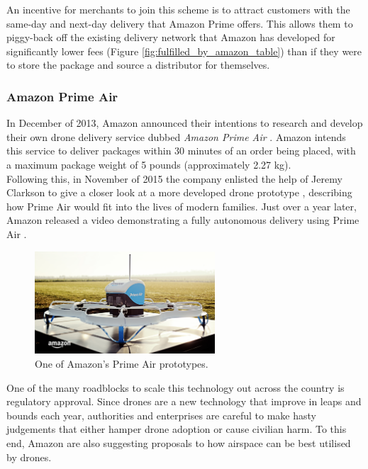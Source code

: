 \documentclass[a4paper,12pt,titlepage]{article}
\begin{document}
An incentive for merchants to join this scheme is to attract customers with the same-day and next-day delivery that Amazon Prime offers. This allows them to piggy-back off the existing delivery network that Amazon has developed for significantly lower fees (Figure \ref{fig:fulfilled_by_amazon_table}) than if they were to store the package and source a distributor for themselves.

\subsubsection{Amazon Prime Air}
In December of 2013, Amazon announced their intentions to research and develop their own drone delivery service dubbed \textit{Amazon Prime Air} \cite{Amazon.comInc.2013}. Amazon intends this service to deliver packages within 30 minutes of an order being placed, with a maximum package weight of 5 pounds (approximately 2.27 kg).\\

Following this, in November of 2015 the company enlisted the help of Jeremy Clarkson to give a closer look at a more developed drone prototype \cite{Amazon.comInc.2015b}, describing how Prime Air would fit into the lives of modern families. Just over a year later, Amazon released a video demonstrating a fully autonomous delivery using Prime Air \cite{Amazon.comInc.2016}.

\begin{figure}[!hbpt]
  \centering
  \includegraphics[width=0.6\textwidth]{img/amazon_prime_air_drone.png}
  \caption{One of Amazon's Prime Air prototypes. \cite{Amazon.comInc.}}
  \label{fig:prime_air_example}
\end{figure}

One of the many roadblocks to scale this technology out across the country is regulatory approval. Since drones are a new technology that improve in leaps and bounds each year, authorities and enterprises are careful to make hasty judgements that either hamper drone adoption or cause civilian harm. To this end, Amazon are also suggesting proposals to how airspace can be best utilised by drones. \cite{Amazon.comInc.2015} \cite{Amazon.comInc.2015a}
\end{document}
